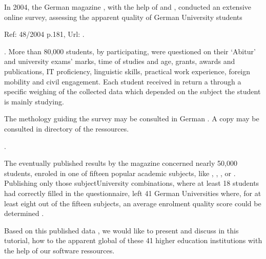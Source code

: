 \documentclass[a4paper,12pt,english]{sphinxhowto}
\begin{document}
In 2004, the German magazine , with the help of  and , conducted an extensive online survey, assessing the apparent quality of German University students %
\begin{footnote}[28]\sphinxAtStartFootnote
Ref:  48/2004 p.181, Url:  .
%
\end{footnote}. More than 80,000 students, by participating, were questioned on their ‘Abitur’ and university exams’ marks, time of studies and age, grants, awards and publications, IT proficiency, linguistic skills, practical work experience, foreign mobility and civil engagement. Each student received in return a  through a specific weighing of the collected data which depended on the subject the student is mainly studying. %
\begin{footnote}[29]\sphinxAtStartFootnote
The methology guiding the  survey may be consulted in German  . A copy may be consulted in  directory of the  ressources.
%
\end{footnote}.

The eventually published results by the  magazine concerned nearly 50,000 students, enroled in one of fifteen popular academic subjects, like , , ,   or . Publishing only those subject\sphinxhyphen{}University combinations, where at least 18 students had correctly filled in the questionnaire, left 41 German Universities where, for at least eight out of the fifteen subjects, an average enrolment quality score could be determined \sphinxfootnotemark[29].

Based on this published data \sphinxfootnotemark[28], we would like to present and discuss in this tutorial, how to  the apparent global  of these 41 higher education institutions with the help of our  software ressources.
\end{document}
